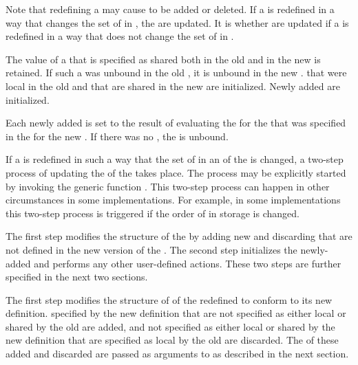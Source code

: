 Note that redefining a  may cause  to be added or 
deleted.  If a  is redefined in a way that changes the set of
  in , the  
are updated.  It is  whether  
are updated if a  is redefined in a way that does not change 
the set of   in .

The value of a  
that is specified as shared both in the old 
and in the new  is retained.  
If such a  was unbound
in the old , it is unbound in the new .  
 that
were local in the old  and that are shared in the new 
 are
initialized.  Newly added  are initialized.

Each newly added  is set to the result of evaluating the
 for the  that was specified 
in the   for the new .  
If there was no , the  is unbound.

If a  is redefined in such a way that the set of
  in an  of the  
is changed, a two-step process of updating the  of the
 takes place.  The process may be explicitly started by 
invoking the generic function .  This
two-step process can happen in other circumstances in some implementations.
For example, in some implementations this two-step process is
triggered if the order of  in storage is changed.

The first step modifies the structure of the  by adding new
 and discarding  that are not
defined in the new version of the .  The second step
initializes the newly-added  and performs any other
user-defined actions. These two steps are further specified
in the next two sections.



The first step modifies the structure of  of the redefined
 to conform to its new  definition.  
 specified
by the new  definition that are not specified as either local or
shared by the old  are added, and  
not specified as either
local or shared by the new  definition that are specified as
local by the old  are discarded. 
The  of these added and discarded
 are passed as arguments 
to 
as described in the next section.

